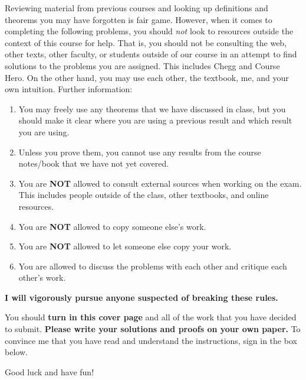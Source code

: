 \documentclass[11pt]{article}
\theoremstyle{definition}
\begin{document}
Reviewing material from previous courses and looking up definitions and theorems you may have forgotten is fair game. However, when it comes to completing the following problems, you should \emph{not} look to resources outside the context of this course for help.  That is, you should not be consulting the web, other texts, other faculty, or students outside of our course in an attempt to find solutions to the problems you are assigned.  This includes Chegg and Course Hero. On the other hand, you may use each other, the textbook, me, and your own intuition. Further information:
\begin{enumerate}
\item You may freely use any theorems that we have discussed in class, but you should make it clear where you are using a previous result and which result you are using.  %
\item Unless you prove them, you cannot use any results from the course notes/book that we have not yet covered.
\item You are \textbf{NOT} allowed to consult external sources when working on the exam.  This includes people outside of the class, other textbooks, and online resources.
\item You are \textbf{NOT} allowed to copy someone else's work.
\item You are \textbf{NOT} allowed to let someone else copy your work.
\item You are allowed to discuss the problems with each other and critique each other's work.
\end{enumerate}

\begin{center}
\textbf{I will vigorously pursue anyone suspected of breaking these rules.}
\end{center}

You should \textbf{turn in this cover page} and all of the work that you have decided to submit. \textbf{Please write your solutions and proofs on your own paper.} To convince me that you have read and understand the instructions, sign in the box below.

\bigskip


\bigskip

Good luck and have fun!
\end{document}
